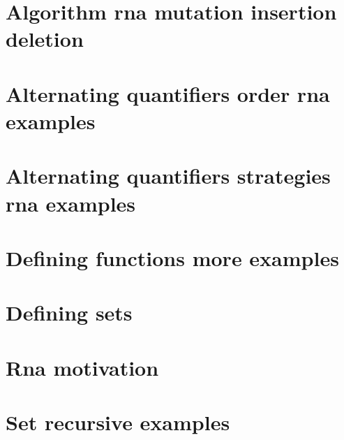 
\section*{Algorithm rna mutation insertion deletion}

\vfill
\section*{Alternating quantifiers order rna examples}

\vfill
\section*{Alternating quantifiers strategies rna examples}

\vfill
\section*{Defining functions more examples}

\vfill
\section*{Defining sets}

\vfill
\section*{Rna motivation}

\vfill
\section*{Set recursive examples}

\vfill
